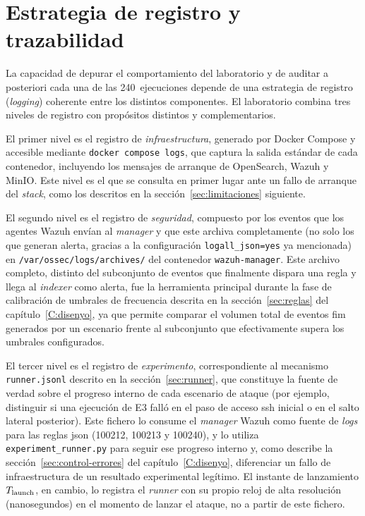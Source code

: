 \documentclass[../main.tex]{subfiles}
\begin{document}
\section{Estrategia de registro y trazabilidad}
\label{sec:logging}

La capacidad de depurar el comportamiento del laboratorio y de auditar a
posteriori cada una de las 240~ejecuciones depende de una estrategia de
registro (\emph{logging}) coherente entre los distintos componentes. El
laboratorio combina tres niveles de registro con propósitos distintos y
complementarios.

El primer nivel es el registro de \emph{infraestructura}, generado por Docker
Compose y accesible mediante \texttt{docker compose logs}, que captura la
salida estándar de cada contenedor, incluyendo los mensajes de arranque de
OpenSearch, Wazuh y MinIO. Este nivel es el que se consulta en primer lugar ante
un fallo de arranque del \emph{stack}, como los descritos en la
sección~\ref{sec:limitaciones} siguiente.

El segundo nivel es el registro de \emph{seguridad}, compuesto por los eventos
que los agentes Wazuh envían al \emph{manager} y que este archiva
completamente (no solo los que generan alerta, gracias a la configuración
\texttt{logall\_json=yes} ya mencionada) en \texttt{/var/ossec/logs/archives/}
del contenedor \texttt{wazuh-manager}. Este archivo completo, distinto del
subconjunto de eventos que finalmente dispara una regla y llega al
\emph{indexer} como alerta, fue la herramienta principal durante la fase de
calibración de umbrales de frecuencia descrita en la
sección~\ref{sec:reglas} del capítulo~\ref{C:disenyo}, ya que permite
comparar el volumen total de eventos \gls{fim} generados por un escenario
frente al subconjunto que efectivamente supera los umbrales configurados.

El tercer nivel es el registro de \emph{experimento}, correspondiente al
mecanismo \texttt{runner.jsonl} descrito en la sección~\ref{sec:runner}, que
constituye la fuente de verdad sobre el progreso interno de cada escenario de
ataque (por ejemplo, distinguir si una ejecución de E3 falló en el paso de acceso
\gls{ssh} inicial o en el salto lateral posterior). Este fichero lo consume el
\emph{manager} Wazuh como fuente de \emph{logs} para las reglas \gls{json} (100212,
100213 y 100240), y lo utiliza \texttt{experiment\_runner.py} para seguir ese
progreso interno y, como describe la sección~\ref{sec:control-errores} del
capítulo~\ref{C:disenyo}, diferenciar un fallo de infraestructura de un resultado
experimental legítimo. El instante de lanzamiento $T_{\text{launch}}$, en cambio, lo
registra el \emph{runner} con su propio reloj de alta resolución (nanosegundos) en
el momento de lanzar el ataque, no a partir de este fichero.
\end{document}
